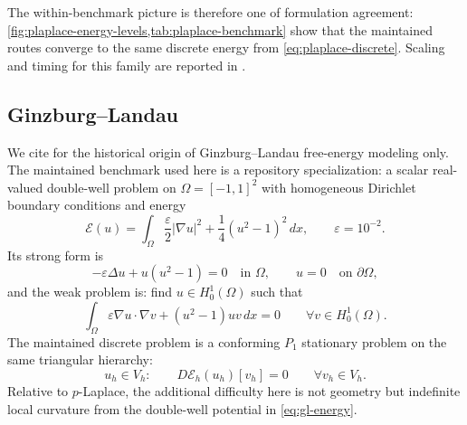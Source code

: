 \begin{table}[H]
  \centering
  
  \caption{Representative final discrete energies from
  \cref{eq:plaplace-discrete} on the showcase case.}
  \label{tab:plaplace-benchmark}
\end{table}

The within-benchmark picture is therefore one of formulation agreement:
\cref{fig:plaplace-energy-levels,tab:plaplace-benchmark} show that the
maintained routes converge to the same discrete energy from
\cref{eq:plaplace-discrete}. Scaling and timing for this family are reported in
.

\subsection{Ginzburg--Landau}
\label{sec:bench-gl}

We cite \citet{ginzburg1950theory} for the historical origin of
Ginzburg--Landau free-energy modeling only. The maintained benchmark used here is a
repository specialization: a scalar real-valued double-well problem on
$\Omega = [-1,1]^2$ with homogeneous Dirichlet boundary conditions and energy
\begin{equation}
  \mathcal{E}(u)
  =
  \int_{\Omega}
    \frac{\varepsilon}{2} \lvert \nabla u \rvert^2
    + \frac{1}{4}(u^2 - 1)^2 \, dx,
  \qquad
  \varepsilon = 10^{-2}.
  \label{eq:gl-energy}
\end{equation}
Its strong form is
\begin{equation}
  -\varepsilon \Delta u + u(u^2 - 1) = 0
  \quad \text{in }\Omega,
  \qquad
  u = 0 \quad \text{on }\partial\Omega,
  \label{eq:gl-strong}
\end{equation}
and the weak problem is: find $u \in H_0^1(\Omega)$ such that
\begin{equation}
  \int_{\Omega}
    \varepsilon \nabla u \cdot \nabla v
    + (u^2 - 1) u v \, dx
  = 0
  \qquad \forall v \in H_0^1(\Omega).
  \label{eq:gl-weak}
\end{equation}
The maintained discrete problem is a conforming $P_1$ stationary problem on the
same triangular hierarchy:
\begin{equation}
  u_h \in V_h:
  \qquad
  D\mathcal{E}_h(u_h)[v_h] = 0
  \qquad \forall v_h \in V_h.
  \label{eq:gl-discrete}
\end{equation}
Relative to $p$-Laplace, the additional difficulty here is not geometry but
indefinite local curvature from the double-well potential in
\cref{eq:gl-energy}.

